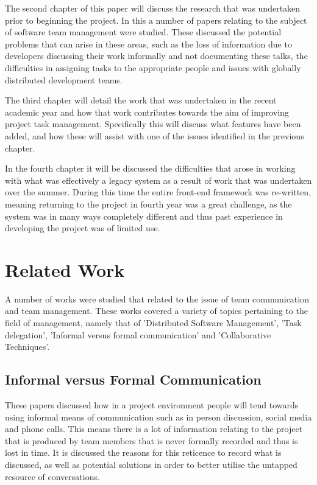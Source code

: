 \documentclass{l4proj}
\begin{document}
The second chapter of this paper will discuss the research that was undertaken prior to beginning the project. In this a number of papers relating to the subject of software team management were studied.  These discussed the potential problems that can arise in these areas, such as the loss of information due to developers discussing their work informally and not documenting these talks, the difficulties in assigning tasks to the appropriate people and issues with globally distributed development teams.

The third chapter will detail the work that was undertaken in the recent academic year and how that work contributes towards the aim of improving project task management. Specifically this will discuss what features have been added, and how these will assist with one of the issues identified in the previous chapter.

In the fourth chapter it will be discussed the difficulties that arose in working with what was effectively a legacy system as a result of work that was undertaken over the summer.  During this time the entire front-end framework was re-written, meaning returning to the project in fourth year was a great challenge, as the system was in many ways completely different and thus past experience in developing the project was of limited use.  

\chapter{Related Work}
A number of works were studied that related to the issue of team communication and team management.  These works covered a variety of topics pertaining to the field of management, namely that of 'Distributed Software Management', 'Task delegation', 'Informal versus formal communication' and 'Collaborative Techniques'.

\section {Informal versus Formal Communication}

These papers discussed how in a project environment people will tend towards using informal means of communication such as in person discussion, social media and phone calls.  This means there is a lot of information relating to the project that is produced by team members that is never formally recorded and thus is lost in time.  It is discussed the reasons for this reticence to record what is discussed, as well as potential solutions in order to better utilise the untapped resource of conversations.
\end{document}
